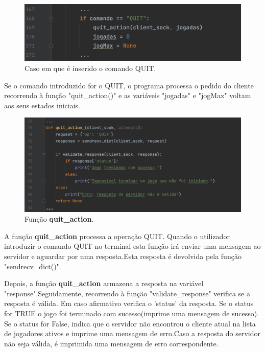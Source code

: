 \documentclass{report}
\begin{document}
\begin{figure}[H]
        \centering
        \includegraphics[scale=0.43]{quit}      
        \caption{Caso em que é inserido o comando QUIT.}
\end{figure}
Se o comando introduzido for o QUIT, o programa processa o pedido do cliente recorrendo à função "quit\_action()" e as variáveis "jogadas" e "jogMax" voltam aos seus estados iniciais.
\begin{figure}[H]
        \centering
        \includegraphics[scale=0.43]{quitAction}      
        \caption{Função \textbf{quit\_action}.}
\end{figure}
A função \textbf{quit\_action} processa a operação QUIT. Quando o utilizador introduzir o comando QUIT no terminal esta função irá enviar uma mensagem ao servidor e aguardar por uma resposta.Esta resposta é devolvida pela função "sendrecv\_dict()".

Depois, a função \textbf{quit\_action} armazena a resposta na variável "response".Seguidamente, recorrendo à função "validate\_response" verifica se a resposta é válida. Em caso afirmativo verifica o 'status' da resposta. Se o status for TRUE o jogo foi terminado com sucesso(imprime uma mensagem de sucesso). Se o status for False, indica que o servidor não encontrou o cliente atual na lista de jogadores ativos e imprime uma mensagem de erro.Caso a resposta do servidor não seja válida, é imprimida uma mensagem de erro correspondente.
\end{document}
